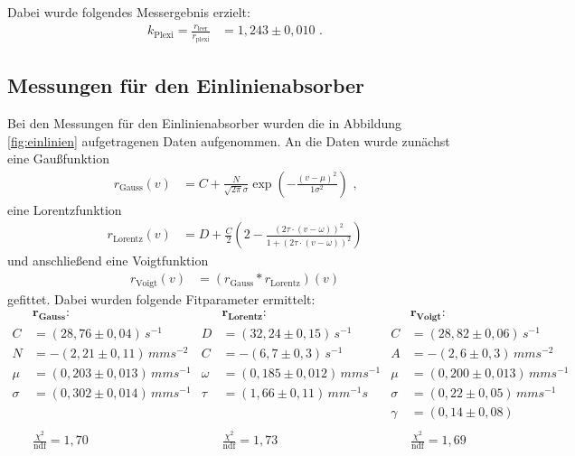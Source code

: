 Dabei wurde folgendes Messergebnis erzielt:
\begin{align}
	k_\text{Plexi}=\frac{r_\text{leer}}{r_\text{plexi}}&=1,243\pm0,010\text{ .}
\end{align}

\subsection{Messungen für den Einlinienabsorber}
Bei den Messungen für den Einlinienabsorber wurden die in Abbildung \ref{fig:einlinien} aufgetragenen Daten aufgenommen. An die Daten wurde zunächst eine Gaußfunktion
\begin{align}
	r_\mathrm{Gauss}(v)&=C+\frac{N}{\sqrt{2\pi}\sigma}\exp(-\frac{(v-\mu)^2}{1\sigma^2})\text{ ,}
\end{align}
eine Lorentzfunktion 
\begin{align}
	r_\mathrm{Lorentz}(v)&=D+\frac{C}{2}\left(2-\frac{\left(2\tau\cdot(v-\omega)\right)^2}{1+\left(2\tau\cdot(v-\omega)\right)^2}\right)
\end{align}
und anschließend eine Voigtfunktion 
\begin{align}
	r_\mathrm{Voigt}(v)&=\left(r_\mathrm{Gauss}*r_\mathrm{Lorentz}\right)(v)
\end{align}
gefittet. Dabei wurden folgende Fitparameter ermittelt:
\begin{align*}
	&\mathbf{r_\textbf{Gauss}}\textbf{:}&&\mathbf{r_\textbf{Lorentz}}\textbf{:}&&\mathbf{r_\textbf{Voigt}}\textbf{:}\\
	C&=(28,76\pm0,04)\,\si{s^{-1}}&D&=(32,24\pm0,15)\,\si{s^{-1}}&C&=(28,82\pm0,06)\,\si{s^{-1}}
	\\N&=-(2,21\pm0,11)\,\si{mms^{-2}}&C&=-(6,7\pm0,3)\,\si{s^{-1}}&A&=-(2,6\pm0,3)\,\si{mms^{-2}}
	\\\mu&=(0,203\pm0,013)\,\si{mms^{-1}}&\omega&=(0,185\pm0,012)\,\si{mms^{-1}}&\mu&=(0,200\pm0,013)\,\si{mms^{-1}}
	\\\sigma&=(0,302\pm0,014)\,\si{mms^{-1}}&\tau&=(1,66\pm0,11)\,\si{mm^{-1}s}&\sigma&=(0,22\pm0,05)\,\si{mms^{-1}}
	\\&&&&\gamma&=(0,14\pm0,08)\\\ 
	\\&\frac{\chi^2}{\mathrm{ndf}}=1,70&&\frac{\chi^2}{\mathrm{ndf}}=1,73&&\frac{\chi^2}{\mathrm{ndf}}=1,69
\end{align*}




